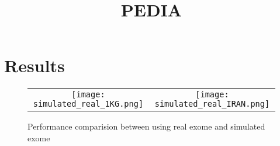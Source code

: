 \documentclass[12pt,cspaper]{paper}
\begin{document}
\title{PEDIA}

\maketitle

\begin{comment}
\section{Data preprocessing}
We have 348 cases in total. 329 of them are simulated, and 19 are real
cases. There are 9 cases are excluded in preprocessing, because we can
not find the pathogenic mutation gene in their gene list. The
details of cases which we excluded are listed in Table
\ref{table:problem_case}.

After preprocessing, we have 339 cases, and there are 66 cases without Gestalt score in the pathogenic
mutation gene. The detail of these cases are listed in Table
\ref{table:no_gestalt_sample}. Later, we will compare the results
between using 339 cases and 273 cases.





\end{comment}
\section{Results}
\begin{comment}
Table \ref{table:cv} and Table \ref{table:cv_g} show the result of
10-fold cross validation between using all cases and only using the
cases with gestalt score in pathogenic mutation gene.
In Table \ref{table:cv_sample_no_g}, it show the result of 66 cases
without gestalt score in pathogenic mutation gene.
The distribution of pedia score are shown on Table \ref{table:pedia_cv}
and Table \ref{table:pedia_cv_g}.



\end{comment}


\begin{figure}[ht]
  \begin{center}
    \graphicspath{{./}}
    \begin{tabular}{cc}
      \texttt{[image: simulated\_real\_1KG.png]}&
      \texttt{[image: simulated\_real\_IRAN.png]}\\
    \end{tabular}
  \caption{Performance comparision between using real exome and
  simulated exome}
  \end{center}
\end{figure}
\end{document}
